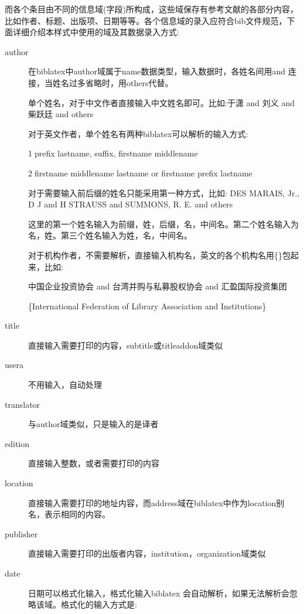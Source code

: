 而各个条目由不同的信息域(字段)所构成，这些域保存有参考文献的各部分内容，比如作者、标题、出版项、日期等等。各个信息域的录入应符合bib文件规范，下面详细介绍本样式中使用的域及其数据录入方式:

\begin{description}
  \item[author] 在biblatex中author域属于name数据类型，输入数据时，各姓名间用and 连接，当姓名过多省略时，用others代替。

      单个姓名，对于中文作者直接输入中文姓名即可。比如:于潇 and 刘义 and 柴跃廷 and others

      对于英文作者，单个姓名有两种biblatex可以解析的输入方式:

      \textcircled{1}prefix lastname, suffix, firstname middlename

      \textcircled{2}firstname middlename lastname or firstname prefix lastname

      对于需要输入前后缀的姓名只能采用第一种方式，比如:
      DES MARAIS, Jr., D J and H STRAUSS and SUMMONS, R. E. and others

      这里的第一个姓名输入为前缀，姓，后缀，名，中间名。第二个姓名输入为名，姓。第三个姓名输入为姓，名，中间名。


      对于机构作者，不需要解析，直接输入机构名，英文的各个机构名用\{\}包起来，比如:

      中国企业投资协会 and 台湾并购与私募股权协会 and 汇盈国际投资集团

      \{International Federation of Library Association and Institutions\}

  \item[title] 直接输入需要打印的内容，subtitle或titleaddon域类似
  \item[usera] 不用输入，自动处理
  \item[translator] 与author域类似，只是输入的是译者
  \item[edition] 直接输入整数，或者需要打印的内容
  \item[location] 直接输入需要打印的地址内容，而address域在biblatex中作为location别名，表示相同的内容。
  \item[publisher] 直接输入需要打印的出版者内容，institution，organization域类似
  \item[date] 日期可以格式化输入，格式化输入biblatex 会自动解析，如果无法解析会忽略该域。格式化的输入方式是:


\end{description}

